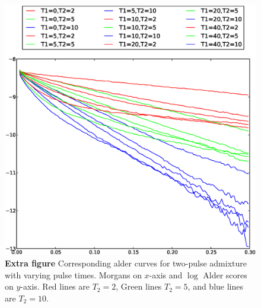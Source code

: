 

\begin{figure}
\includegraphics[scale=.6]{alder_Ts.eps}
\caption{
{\bf Extra figure} Corresponding alder curves for two-pulse admixture with varying pulse times. Morgans on $x$-axis and $\log$ Alder scores on $y$-axis. Red lines are $T_2=2$, Green lines $T_2=5$, and blue lines are $T_2=10$.
}
\end{figure}

